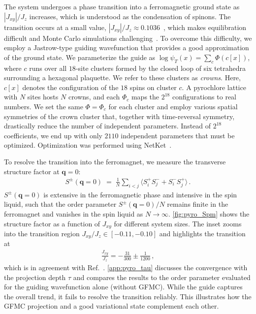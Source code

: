 \documentclass{SciPost}
\begin{document}
The system undergoes a phase transition into a ferromagnetic ground state as $|J_{xy}|/J_z$ increases, which is understood as the condensation of spinons.
%
The transition occurs at a small value, $|J_{xy}|/J_z\approx 0.1036$~\cite{banerjee_unusual_2008}, which makes equilibration difficult and Monte Carlo simulations challenging~\cite{kato_numerical_2015,huang_extended_2020}.
%
To overcome this difficulty, we employ a Jastrow-type guiding wavefunction that provides a good approximation of the ground state.
%
We parameterize the guide as $\log\psi_T(x) = \sum_c \Phi(c[x])$, where $c$ runs over all $18$-site clusters formed by the closed loop of six tetrahedra surrounding a hexagonal plaquette.
%
We refer to these clusters as \emph{crowns}.
%
Here, $c[x]$ denotes the configuration of the $18$ spins on cluster $c$.
%
A pyrochlore lattice with $N$ sites hosts $N$ crowns, and each $\Phi_c$ maps the $2^{18}$ configurations to real numbers.
%
We set the same $\Phi=\Phi_c$ for each cluster and employ various spatial symmetries of the crown cluster that, together with time-reversal symmetry, drastically reduce the number of independent parameters.
%
Instead of $2^{18}$ coefficients, we end up with only $2110$ independent parameters that must be optimized.
%
Optimization was performed using NetKet~\cite{SciPostPhysCodeb.7,SciPostPhysCodeb.7-r3.4}.

To resolve the transition into the ferromagnet, we measure the transverse structure factor at $\bm{q}=0$:
\begin{align}
	S^{\pm}(\bm{q}=0) \;=\; \frac{1}{N}\sum_{i<j}\langle S^+_i S^-_j + S^-_i S^+_j\rangle\,.
	\label{eq:Spm_q0}
\end{align}
$S^{\pm}(\bm{q}=0)$ is extensive in the ferromagnetic phase and intensive in the spin liquid, such that the order parameter $S^{\pm}(\bm{q}=0)/N$ remains finite in the ferromagnet and vanishes in the spin liquid as $N\rightarrow \infty$.
%
\autoref{fig:pyro_Spm} shows the structure factor as a function of $J_{xy}$ for different system sizes.
%
The inset zooms into the transition region $J_{xy}/J_z\in[-0.11,-0.10]$ and highlights the transition at
\begin{align}
	\frac{J_{xy}}{J_z}=-\frac{31}{300}\pm\frac{1}{1200}\,,
	\label{eq:transition}
\end{align}
which is in agreement with Ref.~\cite{banerjee_unusual_2008}.
%
\autoref{app:pyro_tau} discusses the convergence with the projection depth $\tau$ and compares the results to the order parameter evaluated for the guiding wavefunction alone (without GFMC).
%
While the guide captures the overall trend, it fails to resolve the transition reliably.
%
This illustrates how the GFMC projection and a good variational state complement each other.
\end{document}
